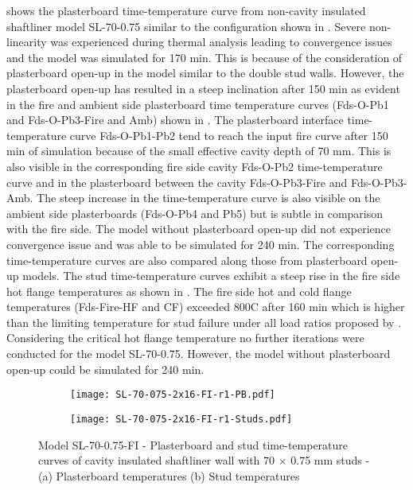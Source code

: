  shows the plasterboard time-temperature curve from non-cavity insulated shaftliner model SL-70-0.75 similar to the configuration shown in . Severe non-linearity was experienced during thermal analysis leading to convergence issues and the model was simulated for 170 min. This is because of the consideration of plasterboard open-up in the model similar to the double stud walls. However, the plasterboard open-up has resulted in a steep inclination after 150 min as evident in the fire and ambient side plasterboard time temperature curves (Fds-O-Pb1 and Fds-O-Pb3-Fire and Amb) shown in . The plasterboard interface time-temperature curve Fds-O-Pb1-Pb2 tend to reach the input fire curve after 150 min of simulation because of the small effective cavity depth of 70 mm. This is also visible in the corresponding fire side cavity Fds-O-Pb2 time-temperature curve and in the plasterboard between the cavity Fds-O-Pb3-Fire and Fds-O-Pb3-Amb. The steep increase in the time-temperature curve is also visible on the ambient side plasterboards (Fds-O-Pb4 and Pb5) but is subtle in comparison with the fire side. The model without plasterboard open-up did not experience convergence issue and was able to be simulated for 240 min. The corresponding time-temperature curves are also compared along those from plasterboard open-up models. The stud time-temperature curves exhibit a steep rise in the fire side hot flange temperatures as shown in . The fire side hot and cold flange temperatures (Fds-Fire-HF and CF) exceeded 800\degree C after 160 min which is higher than the limiting temperature for stud failure under all load ratios proposed by \citet{Gunalan2013a}. Considering the critical hot flange temperature no further iterations were conducted for the model SL-70-0.75. However, the model without plasterboard open-up could be simulated for 240 min.
\begin{figure}[!htbp]
	\centering
	\begin{subfigure}[b]{0.6\textwidth}
		\centering
		\texttt{[image: SL-70-075-2x16-FI-r1-PB.pdf]}
		\caption{}
		\label{subfig:SL-70-075-2x16-FI-r1-PB}
	\end{subfigure}
	\begin{subfigure}[b]{0.6\textwidth}
		\centering
		\texttt{[image: SL-70-075-2x16-FI-r1-Studs.pdf]}
		\caption{}
		\label{subfig:SL-70-075-2x16-FI-r1-Studs}
	\end{subfigure}
	   \caption{Model SL-70-0.75-FI - Plasterboard and stud time-temperature curves of cavity insulated shaftliner wall with 70 $\times$ 0.75 mm studs - (a) Plasterboard temperatures (b) Stud temperatures}
	   \label{fig:SL-70-075-2x16-FI-r1}
\end{figure}

